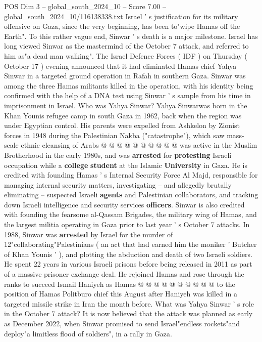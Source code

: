 \begin{textsample}{POS Dim 3 – global\_south\_2024\_10 – Score 7.00 – global\_south\_2024\_10/116138338.txt}  \label{ex:f3_pos_406}
Israel ' s justification for its military offensive on Gaza, since the very beginning, has been to"wipe Hamas off the Earth".
To this rather vague end, Sinwar ' s death is a major milestone.
Israel has long viewed Sinwar as the mastermind of the October 7 attack, and referred to him as"a dead man walking".
The Israel Defence Forces ( IDF ) on Thursday ( October 17 ) evening announced that it had eliminated Hamas chief Yahya Sinwar in a targeted ground operation in Rafah in southern Gaza.
Sinwar was among the three Hamas militants killed in the operation, with his identity being confirmed with the help of a DNA test using Sinwar ' s sample from his time in imprisonment in Israel.
Who was Yahya Sinwar?
Yahya Sinwarwas born in the Khan Younis refugee camp in south Gaza in 1962, back when the region was under Egyptian control.
His parents were expelled from Ashkelon by Zionist forces in 1948 during the Palestinian Nakba ("catastrophe"), which saw mass-scale ethnic cleansing of Arabs @ @ @ @ @ @ @ @ @ @ was active in the Muslim Brotherhood in the early 1980s, and was \textbf{arrested} for \textbf{protesting} Israeli occupation while a \textbf{college} \textbf{student} at the Islamic \textbf{University} in Gaza.
He is credited with founding Hamas ' s Internal Security Force Al Majd, responsible for managing internal security matters, investigating -- and allegedly brutally eliminating -- suspected Israeli \textbf{agents} and Palestinian collaborators, and tracking down Israeli intelligence and security services \textbf{officers}.
Sinwar is also credited with founding the fearsome al-Qassam Brigades, the military wing of Hamas, and the largest militia operating in Gaza prior to last year ' s October 7 attacks.
In 1988, Sinwar was \textbf{arrested} by Israel for the murder of 12"collaborating"Palestinians ( an act that had earned him the moniker ' Butcher of Khan Younis ' ), and plotting the abduction and death of two Israeli soldiers.
He spent 22 years in various Israeli prisons before being released in 2011 as part of a massive prisoner exchange deal.
He rejoined Hamas and rose through the ranks to succeed Ismail Haniyeh as Hamas @ @ @ @ @ @ @ @ @ @ to the position of Hamas Politburo chief this August after Haniyeh was killed in a targeted missile strike in Iran the month before.
What was Yahya Sinwar ' s role in the October 7 attack?
It is now believed that the attack was planned as early as December 2022, when Sinwar promised to send Israel"endless rockets"and deploy"a limitless flood of soldiers", in a rally in Gaza.

\end{textsample}
